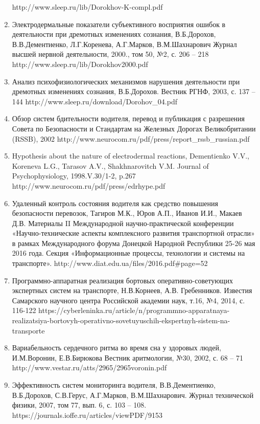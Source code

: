\begin{enumerate}
    http://www.sleep.ru/lib/Dorokhov-K-compl.pdf 
    \item Электродермальные показатели субъективного восприятия ошибок в деятельности при дремотных изменениях сознания, В.Б.Дорохов, В.В.Дементиенко, Л.Г.Коренева, А.Г.Марков, В.М.Шахнарович
    Журнал высшей нервной деятельности, 2000., том 50, №2, с. 206 – 218
    http://www.sleep.ru/lib/Dorokhov2000.pdf 
    \item Анализ психофизиологических механизмов нарушения деятельности при дремотных изменениях сознания, В.Б.Дорохов. Вестник РГНФ, 2003, с. 137 – 144
    http://www.sleep.ru/download/Dorohov_04.pdf 
    \item Обзор систем бдительности водителя, перевод и публикация с разрешения Совета по Безопасности и Стандартам на Железных Дорогах Великобритании (RSSB), 2002
    http://www.neurocom.ru/pdf/press/report_rssb_russian.pdf 
    \item Hypothesis about the nature of electrodermal reactions, Dementienko V.V., Koreneva L.G., Tarasov A.V., Shakhnarovitch V.M. Journal of Psychophysiology, 1998.V.30/1-2, p.267
    http://www.neurocom.ru/pdf/press/edrhype.pdf 
    \item Удаленный контроль состояния водителя как средство повышения безопасности перевозок, Тагиров М.К., Юров А.П., Иванов И.И., Макаев Д.В. Материалы II Международной научно-практической конференции «Научно-технические аспекты комплексного развития транспортной отрасли» в рамках Международного форума Донецкой Народной Республики 25-26 мая 2016 года. Секция «Информационные процессы, технологии и системы на транспорте».
    http://www.diat.edu.ua/files/2016.pdf#page=52 
    \item Программно-аппаратная реализация бортовых оперативно-советующих экспертных систем на транспорте, Н.В.Корнеев, А.В. Гребенников. Известия Самарского научного центра Российской академии наук, т.16, №4, 2014, с. 116-122
    https://cyberleninka.ru/article/n/programmno-apparatnaya-realizatsiya-bortovyh-operativno-sovetuyuschih-ekspertnyh-sistem-na-transporte 
    \item Вариабельность сердечного ритма во время сна у здоровых людей, И.М.Воронин, Е.В.Бирюкова
    Вестник аритмологии, №30, 2002, с. 68 – 71
    http://www.vestar.ru/atts/2965/2965voronin.pdf 
    \item Эффективность систем мониторинга водителя, В.В.Дементиенко, В.Б.Дорохов, С.В.Герус, А.Г.Марков, В.М.Шахнарович. Журнал технической физики, 2007, том 77, вып. 6, с. 103 – 108.
    https://journals.ioffe.ru/articles/viewPDF/9153 

\end{enumerate}
